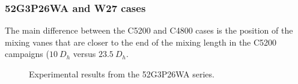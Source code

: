 \subsubsection{52G3P26WA and W27 cases}


The main difference between the C5200 and C4800 cases is the position of the mixing vanes that are closer to the end of the mixing length in the C5200 campaigns ($10\ D_{h}$ versus $23.5\ D_{h}$.

\begin{figure}[!h]
\centering
{}

\caption{Experimental results from the 52G3P26WA series.}
\label{fig:exp_52G3P26W23}
\end{figure}


